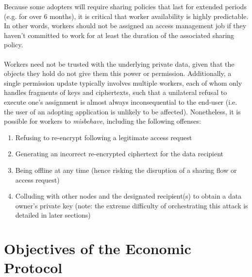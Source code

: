 \documentclass[11pt]{amsart}
\begin{document}
Because some adopters will require sharing policies that last for extended periods (e.g. for over 6 months), it is critical that worker availability is highly predictable. In other words, workers should not be assigned an access management job if they haven't committed to work for at least the duration of the associated sharing policy. 
\\
\\
Workers need not be trusted with the underlying private data, given that the objects they hold do not give them this power or permission. Additionally, a single permission update typically involves multiple workers, each of whom only handles fragments of keys and ciphertexts, such that a unilateral refusal to execute one's assignment is almost always inconsequential to the end-user (i.e. the user of an adopting application is unlikely to be affected). Nonetheless, it is possible for workers to \textit{misbehave}, including the following offenses: 
\begin{enumerate}
   \item Refusing to re-encrypt following a legitimate access request
   \item Generating an incorrect re-encrypted ciphertext for the data recipient
   \item Being offline at any time (hence risking the disruption of a sharing flow or access request) 
   \item Colluding with other nodes and the designated recipient(s) to obtain a data owner’s private key (note: the extreme difficulty of orchestrating this attack is detailed in later sections) 
   \end{enumerate}


\section{Objectives of the Economic Protocol}
\end{document}

